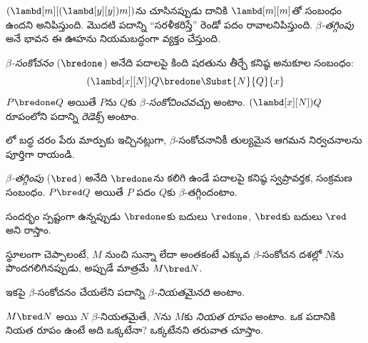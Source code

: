 \documentclass[../../../include/open-logic-section]{subfiles}
\begin{document}

$(\lambd[m][(\lambd[y][y]) m])$ను చూసినప్పుడు దానికి
$\lambd[m][m]$తో సంబంధం ఉందని అనిపిస్తుంది. మొదటి పదాన్ని
“సరళీకరిస్తే” రెండో పదం రావాలనిపిస్తుంది. \emph{$\beta$-తగ్గింపు}
అనే భావన ఈ ఊహను నియమబద్ధంగా వ్యక్తం చేస్తుంది.

\begin{defn} 
  \emph{$\beta$-సంకోచనం} ($\bredone$) అనేది పదాలపై కింది
  షరతును తీర్చే కనిష్ఠ అనుకూల సంబంధం:
  \[
    (\lambd[x][N])Q \bredone \Subst{N}{Q}{x}
  \]
  $P \bredone Q$ అయితే $P$ను $Q$కు \emph{$\beta$-సంకోచించవచ్చు}
  అంటాం. $(\lambd[x][N])Q$ రూపంలోని పదాన్ని
  \emph{రెడెక్స్} అంటాం.
\end{defn}

\begin{prob} 
  లో బద్ధ చరం పేరు మార్పుకు
  ఇచ్చినట్లుగా, $\beta$-సంకోచనానికీ తుల్యమైన ఆగమన నిర్వచనాలను
  పూర్తిగా రాయండి.
\end{prob}

\begin{defn} 
  \emph{$\beta$-తగ్గింపు} ($\bred$) అనేది $\bredone$ను
  కలిగి ఉండే పదాలపై కనిష్ఠ స్వప్రావర్తక, సంక్రమణ సంబంధం.
  $P \bred Q$ అయితే $P$ పదం $Q$కు $\beta$-తగ్గిందంటాం.
\end{defn}

సందర్భం స్పష్టంగా ఉన్నప్పుడు $\bredone$కు బదులు $\redone$,
$\bred$కు బదులు $\red$ అని రాస్తాం.

స్థూలంగా చెప్పాలంటే, $M$ నుంచి సున్నా లేదా అంతకంటే ఎక్కువ
$\beta$-సంకోచన దశల్లో $N$ను పొందగలిగినప్పుడు, అప్పుడే మాత్రమే $M \bred N$.

\begin{defn}
ఇకపై $\beta$-సంకోచనం చేయలేని పదాన్ని
\emph{$\beta$-నియతమైనది} అంటాం.
\end{defn}

$M \bred N$ అయి $N$ $\beta$-నియతమైతే, $N$ను $M$కు
\emph{నియత రూపం} అంటాం. ఒక పదానికి నియత రూపం ఉంటే అది ఒక్కటేనా?
ఒక్కటేనని తరువాత చూస్తాం.
\end{document}
